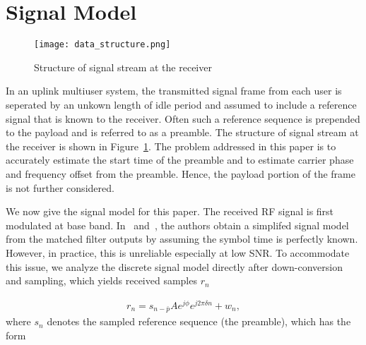 \section{Signal Model}
\label{sec:model}

\begin{figure}[t]
  \centerline{\texttt{[image: data\_structure.png]}}
  \caption{Structure of signal stream at the receiver}
  \label{fig:data_structure}
  \end{figure}

In an uplink multiuser system, the transmitted signal frame from each user is seperated by an unkown length of idle period and assumed to include a reference signal that is known to the receiver.
Often such a reference sequence is prepended to the payload and is referred to as a preamble.
The structure of signal stream at the receiver is shown in Figure~\ref{fig:data_structure}. 
The problem addressed in this paper is to accurately estimate the start time of the preamble and to estimate carrier phase and frequency offset from the preamble.
Hence, the payload portion of the frame is not further considered. 

We now give the signal model for this paper. The received RF signal is first modulated at base band.
In~\cite{Morelli_Mengali_98} and~\cite{Ramakrishnan_10}, the authors obtain a simplifed signal model from the matched filter outputs by assuming the symbol time is perfectly known.
However, in practice, this is unreliable especially at low SNR. To accommodate this issue, we analyze the discrete signal model
directly after down-conversion and sampling, which yields received samples $r_n$

\begin{equation}
    \begin{aligned}
      \label{eq:model}
      r_n = s_{n-\bar{p}}Ae^{j\phi}e^{j2\pi\delta n}+w_{n},
    \end{aligned}
  \end{equation}
where $s_n$ denotes the sampled reference sequence (the preamble), which has the form

